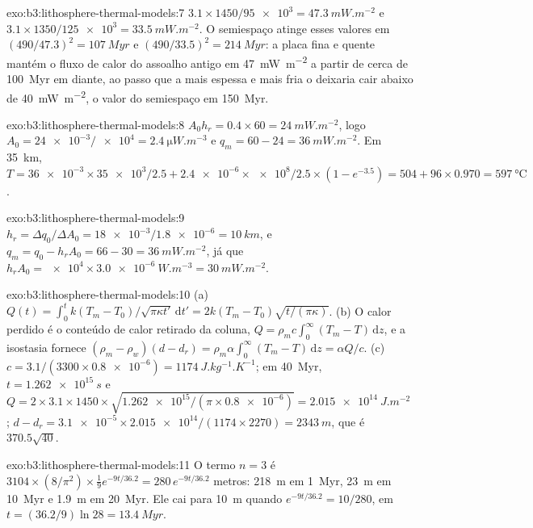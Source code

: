 \begin{solution}{exo:b3:lithosphere-thermal-models:7}
$3.1\times1450/\num{95e3} = \qty{47.3}{mW.m^{-2}}$ e $3.1\times1350/\num{125e3}
= \qty{33.5}{mW.m^{-2}}$. O semiespaço atinge esses valores em $(490/47.3)^2 =
\qty{107}{Myr}$ e $(490/33.5)^2 = \qty{214}{Myr}$: a placa fina e quente mantém
o fluxo de calor do assoalho antigo em \qty{47}{mW.m^{-2}} a partir de cerca de \qty{100}{Myr}
em diante, ao passo que a mais espessa e mais fria o deixaria cair abaixo de
\qty{40}{mW.m^{-2}}, o valor do semiespaço em \qty{150}{Myr}.
\end{solution}

\begin{solution}{exo:b3:lithosphere-thermal-models:8}
$A_0h_r = 0.4\times60 = \qty{24}{mW.m^{-2}}$, logo $A_0 =
\num{24e-3}/\num{e4} = \qty{2.4}{\micro W.m^{-3}}$ e $q_m = 60 - 24 =
\qty{36}{mW.m^{-2}}$. Em \qty{35}{km}, $T = \num{36e-3}\times\num{35e3}/2.5 +
\num{2.4e-6}\times\num{e8}/2.5\times(1 - e^{-3.5}) = 504 + 96\times0.970 =
\qty{597}{\celsius}$.
\end{solution}

\begin{solution}{exo:b3:lithosphere-thermal-models:9}
$h_r = \Delta q_0/\Delta A_0 = \num{18e-3}/\num{1.8e-6} = \qty{10}{km}$, e
$q_m = q_0 - h_rA_0 = 66 - 30 = \qty{36}{mW.m^{-2}}$, já que $h_rA_0 =
\num{e4}\times\qty{3.0e-6}{W.m^{-3}} = \qty{30}{mW.m^{-2}}$.
\end{solution}

\begin{solution}{exo:b3:lithosphere-thermal-models:10}
(a) $Q(t) = \int_0^tk(T_m - T_0)/\sqrt{\pi\kappa t'}\,\mathrm dt' =
2k(T_m - T_0)\sqrt{t/(\pi\kappa)}$. (b) O calor perdido é o conteúdo de calor
retirado da coluna, $Q = \rho_mc\int_0^\infty(T_m - T)\,\mathrm dz$, e
a isostasia fornece $(\rho_m - \rho_w)(d - d_r) = \rho_m\alpha\int_0^\infty(T_m -
T)\,\mathrm dz = \alpha Q/c$. (c) $c = 3.1/(3300\times\num{0.8e-6}) =
\qty{1174}{J.kg^{-1}.K^{-1}}$; em \qty{40}{Myr}, $t = \qty{1.262e15}{s}$ e
$Q = 2\times3.1\times1450\times\sqrt{\num{1.262e15}/(\pi\times\num{0.8e-6})} =
\qty{2.015e14}{J.m^{-2}}$; $d - d_r = \num{3.1e-5}\times\num{2.015e14}/
(1174\times2270) = \qty{2343}{m}$, que é $370.5\sqrt{40}$.
\end{solution}

\begin{solution}{exo:b3:lithosphere-thermal-models:11}
O termo $n = 3$ é $3104\times(8/\pi^2)\times\tfrac19e^{-9t/36.2} =
280\,e^{-9t/36.2}$ metros: \qty{218}{m} em \qty{1}{Myr}, \qty{23}{m} em
\qty{10}{Myr} e \qty{1.9}{m} em \qty{20}{Myr}. Ele cai para \qty{10}{m} quando
$e^{-9t/36.2} = 10/280$, em $t = (36.2/9)\ln28 = \qty{13.4}{Myr}$.
\end{solution}

